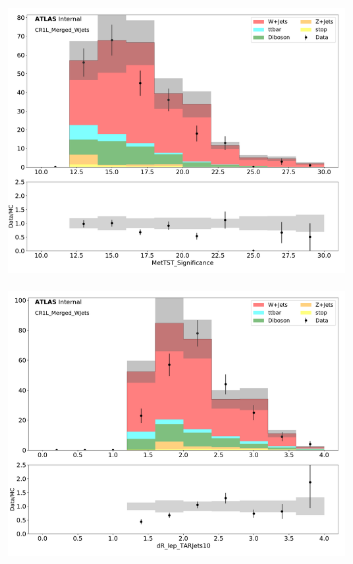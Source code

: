 \begin{figure}[htbp]
\begin{subfigure}{0.49\textwidth}
     \includegraphics[width = 0.98\textwidth]{Figures/4/datamc/CR1L_Merged_WJets/MetTST_Significance.pdf}
     \caption{\metsig}
     \end{subfigure}
    \begin{subfigure}{0.49\textwidth}
     \includegraphics[width = 0.98\textwidth]{Figures/4/datamc/CR1L_Merged_WJets/dR_lep_TARJets10.pdf}
     \caption{\drTARl}
     \end{subfigure}
     \begin{subfigure}{0.49\textwidth}

\end{subfigure}
\end{figure}
